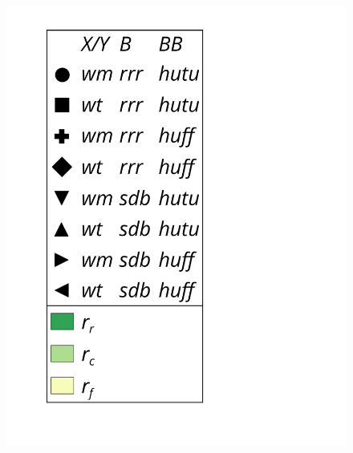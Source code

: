 \begin{figure}
\begin{minipage}{1\textwidth}
\begin{minipage}{0.45\textwidth}
\begin{minipage}{0.25\textwidth}
    				\includegraphics[scale=.16, clip, trim=70 0 0 0]{img/sdsl/label.pdf}
    			\end{minipage}
    			

\end{minipage}
\end{minipage}
\end{figure}
